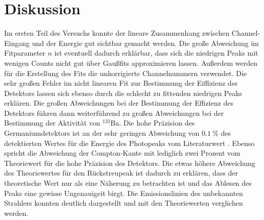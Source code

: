 \section{Diskussion}
Im ersten Teil des Versuchs konnte der lineare Zusammenhang zwischen Channel-Eingang und der Energie gut sichtbar gemacht werden.
Die große Abweichung im Fitparameter $n$ ist eventuell dadurch erklärbar, dass sich die niedrigen Peaks mit wenigen Counts nicht gut über Gaußfits approximieren lassen. Außerdem werden für die Erstellung des Fits die unkorrigierte Channelnummern verwendet.
Die sehr großen Fehler im nicht linearen Fit zur Bestimmung der Eiffizienz des Detektors lassen sich ebenso durch die schlecht zu fittenden
niedrigen Peaks erklären. Die großen Abweichungen bei der Bestimmung der Effizienz des Detektors führen dann weiterführend zu großen Abweichungen bei der Bestimmung der Aktivität von $^{133}$Ba.
Die hohe Präzision des Germaniumdetektors ist an der sehr geringen Abweichung von $\SI{0,1}{\percent}$ des detektierten Wertes für die Energie des Photopeaks vom Literaturwert \cite{Q3}. Ebenso spricht die Abweichung der Compton-Kante mit lediglich zwei Prozent vom Theoriewert für die hohe Präzision des Detektors. Die etwas höhere Abweichung des Theoriewertes für den Rückstreupeak ist dadurch zu erklären, dass der theoretische Wert nur als eine Näherung zu betrachten ist und das Ablesen des Peaks eine gewisse Ungenauigeit birgt.
Die Emissionslinien des unbekannten Strahlers konnten deutlich dargestellt und mit den Theoriewerten verglichen werden.

\printbibliography
